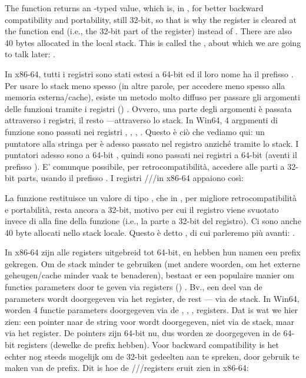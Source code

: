 
The \main function returns an \Tint{}-typed value, which is, in \CCpp, for better backward compatibility
and portability, still 32-bit, so that is why the \EAX register is cleared at the function end (i.e., the 32-bit
part of the register) instead of \RAX{}.
There are also 40 bytes allocated in the local stack.
This is called the , about which we are going to talk later: .
\fi %

\ifdefined\ITALIAN
In x86-64, tutti i registri sono stati estesi a 64-bit ed il loro nome ha il prefisso .
Per usare lo stack meno spesso (in altre parole, per accedere meno spesso alla memoria esterna/cache), esiste un metodo molto diffuso per passare gli argomenti delle funzioni tramite i registri ()
\ifx\LITE\undefined {} \fi
.
Ovvero, una parte degli argomenti è passata attraverso i registri, il resto ---attraverso lo stack.
In Win64, 4 argpmenti di funzione sono passati nei registri \RCX, \RDX, , .
Questo è ciò che vediamo qui: un puntatore alla stringa per \printf è adesso passato nel registro \RCX anziché tramite lo stack.
I puntatori adesso sono a 64-bit , quindi sono passati nei registri a 64-bit (aventi il prefisso ).
E' comunque possibile, per retrocompatibilità, accedere alle parti a 32-bit parts, usando il prefisso .
I registri \RAX/\EAX/\AX/\AL in x86-64 appaiono così:


La funzione \main restituisce un valore di tipo \Tint{}, che in \CCpp, per migliore retrocompatibilità e portabilità, resta ancora a 32-bit, motivo per cui il registro \EAX viene svuotato invece di \RAX{} alla fine della funzione (i.e., la parte a 32-bit
del registro).
Ci sono anche 40 byte allocati nello stack locale.
Questo è detto , di cui parleremo più avanti: .
\fi %

\ifdefined\DUTCH
In x86-64 zijn alle registers uitgebreid tot 64-bit, en hebben hun namen een  prefix gekregen.
Om de stack minder te gebruiken (met andere woorden, om het externe geheugen/cache minder vaak te benaderen), bestaat
er een populaire manier om functies parameters door te geven via registers ()
\ifx\LITE\undefined {} \fi
.
Bv., een deel van de parameters wordt doorgegeven via het register, de rest --- via de stack.
In Win64, worden 4 functie parameters doorgegeven via de \RCX, \RDX, ,  registers.
Dat is wat we hier zien: een pointer naar de string voor \printf wordt doorgegeven, niet via de stack, maar via het \RCX register.
De pointers zijn 64-bit nu, dus worden ze doorgegeven in de 64-bit registers (dewelke de  prefix hebben).
Voor backward compatibility is het echter nog steeds mogelijk om de 32-bit gedeelten aan te spreken, door gebruik te maken van de  prefix.
Dit is hoe de \RAX/\EAX/\AX/\AL registers eruit zien in x86-64:

